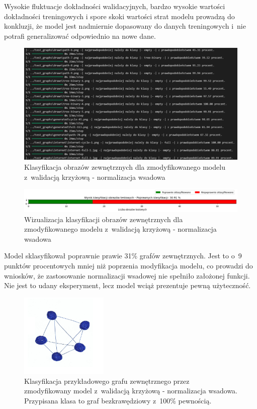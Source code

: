 Wysokie fluktuacje dokładności walidacyjnych, bardzo wysokie wartości dokładności treningowych
i spore skoki wartości strat modelu prowadzą do konkluzji,
że model jest nadmiernie dopasowany do danych treningowych i~nie potrafi generalizować odpowiednio na nowe dane.

\begin{figure}[ht]
	\centering
	\includegraphics[width=15.5cm]{resources/tests/images/v4/crossvalid_2_txt.png}
	\caption{Klasyfikacja obrazów zewnętrznych dla zmodyfikowanego modelu z~walidacją krzyżową - normalizacja wsadowa}
	\label{Fig:tests-cv-2b}
\end{figure}
\FloatBarrier

\begin{figure}[ht]
	\centering
	\includegraphics[width=15.5cm]{resources/tests/images/v4/crossvalid_2_bar.png}
	\caption{Wizualizacja klasyfikacji obrazów zewnętrznych dla zmodyfikowanego modelu z~walidacją krzyżową - normalizacja wsadowa}
	\label{Fig:tests-cv-2c}
\end{figure}
\FloatBarrier

Model sklasyfikował poprawnie prawie 31\% grafów zewnętrznych.
Jest to o~9 punktów procentowych mniej niż poprzenia modyfikacja modelu,
co prowadzi do wniosków, że zastosowanie normalizacji wsadowej nie spełniło założonej funkcji.
Nie jest to udany eksperyment, lecz model wciąż prezentuje pewną użyteczność.

\begin{figure}[ht]
	\centering
	\includegraphics[height=4cm]{../graph_classification/test_graphs/drawn/full-8.png}
	\caption{Klasyfikacja przykładowego grafu zewnętrznego przez zmodyfikowany model z~walidacją krzyżową - normalizacja wsadowa.
		Przypisana klasa to graf bezkrawędziowy z~100\% pewnością.}
	\label{Fig:tests-cv-2d}
\end{figure}
\FloatBarrier

